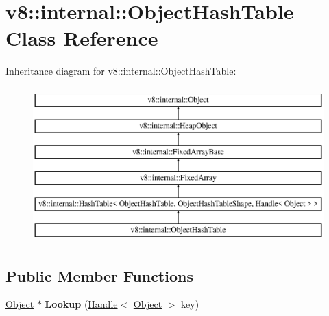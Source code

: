 \hypertarget{classv8_1_1internal_1_1_object_hash_table}{}\section{v8\+:\+:internal\+:\+:Object\+Hash\+Table Class Reference}
\label{classv8_1_1internal_1_1_object_hash_table}
Inheritance diagram for v8\+:\+:internal\+:\+:Object\+Hash\+Table\+:\begin{figure}[H]
\begin{center}
\leavevmode
\includegraphics[height=6.000000cm]{classv8_1_1internal_1_1_object_hash_table}
\end{center}
\end{figure}
\subsection*{Public Member Functions}
\begin{DoxyCompactItemize}
\item 
\hypertarget{classv8_1_1internal_1_1_object_hash_table_aabab652b308038cba6f9dd2d99b6b159}{}\hyperlink{classv8_1_1internal_1_1_object}{Object} $\ast$ {\bfseries Lookup} (\hyperlink{classv8_1_1internal_1_1_handle}{Handle}$<$ \hyperlink{classv8_1_1internal_1_1_object}{Object} $>$ key)\label{classv8_1_1internal_1_1_object_hash_table_aabab652b308038cba6f9dd2d99b6b159}

\end{DoxyCompactItemize}
